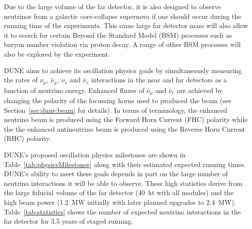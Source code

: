 Due to the large volume of the far detector, it is also designed to observe neutrinos from a galactic core-collapse supernova if one should occur during the running time of the experiments.
This same large far detector mass will also allow it to search for certain Beyond the Standard Model (BSM) processes such as baryon number violation via proton decay.
A range of other BSM processes will also be explored by the experiment.

DUNE aims to achieve its oscillation physics goals by simultaneously measuring the rates of $\nu_{\mu}$, $\bar{\nu}_{\mu}$, $\nu_{e}$ and $\bar{\nu}_{e}$ interactions in the near and far detectors as a function of neutrino energy.
Enhanced fluxes of $\bar{\nu}_{\mu}$ and $\bar{\nu}_{e}$ are achieved by changing the polarity of the focussing horns used to produced the beam (see Section~\ref{sec:dune:beam} for details).
In terms of terminology, the enhanced neutrino beam is produced using the Forward Horn Current (FHC) polarity while the the enhanced antineutrino beam is produced using the Reverse Horn Current (RHC) polarity.

DUNE's proposed oscillation physics milestones are shown in Table~\ref{tab:physicsMilestones} along with their estimated expected running times.
DUNE's ability to meet these goals depends in part on the large number of neutrino interactions it will be able to observe.
These high statistics derive from the large fiducial volume of the far detector (40~kt with all modules) and the high beam power (1.2~MW initially with later planned upgrades to 2.4~MW).
Table~\ref{tab:statistics} shows the number of expected neutrino interactions in the far detector for 3.5 years of staged running.

